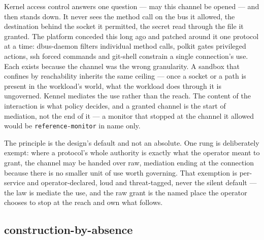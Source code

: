 Kernel access control answers one question --- may this channel be
opened --- and then stands down. It never sees the method call on the
bus it allowed, the destination behind the socket it permitted, the
secret read through the file it granted. The platform conceded this long
ago and patched around it one protocol at a time: dbus-daemon filters
individual method calls, polkit gates privileged actions, ssh forced
commands and git-shell constrain a single connection's use. Each exists
because the channel was the wrong granularity. A sandbox that confines
by reachability inherits the same ceiling --- once a socket or a path is
present in the workload's world, what the workload does through it is
ungoverned. Kennel mediates the use rather than the reach. The content
of the interaction is what policy decides, and a granted channel is the
start of mediation, not the end of it --- a monitor that stopped at the
channel it allowed would be \texttt{reference-monitor} in name only.

The principle is the design's default and not an absolute. One rung is
deliberately exempt: where a protocol's whole authority is exactly what
the operator meant to grant, the channel may be handed over raw,
mediation ending at the connection because there is no smaller unit of
use worth governing. That exemption is per-service and
operator-declared, loud and threat-tagged, never the silent default ---
the law is mediate the use, and the raw grant is the named place the
operator chooses to stop at the reach and own what follows.

\hypertarget{construction-by-absence}{%
\subsection{\texorpdfstring{construction-by-absence}{construction-by-absence}}\label{construction-by-absence}}

